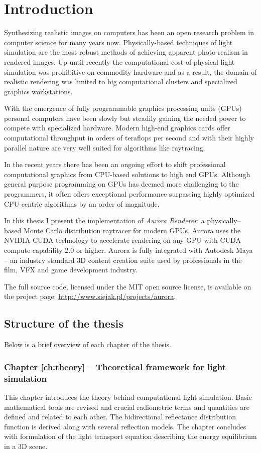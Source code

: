 \chapter{Introduction}
Synthesizing realistic images on computers has been an open research problem in computer science for many years now. Physically-based techniques of light simulation are the most robust methods of achieving apparent photo-realism in rendered images. Up until recently the computational cost of physical light simulation was prohibitive on commodity hardware and as a result, the domain of realistic rendering was limited to big computational clusters and specialized graphics workstations.

With the emergence of fully programmable graphics processing units (GPUs) personal computers have been slowly but steadily gaining the needed power to compete with specialized hardware. Modern high-end graphics cards offer computational throughput in orders of teraflops per second and with their highly parallel nature are very well suited for algorithms like raytracing.

In the recent years there has been an ongoing effort to shift professional computational graphics from CPU-based solutions to high end GPUs. Although general purpose programming on GPUs has deemed more challenging to the programmers, it often offers exceptional performance surpassing highly optimized CPU-centric algorithms by an order of magnitude.

In this thesis I present the implementation of \emph{Aurora Renderer}: a physically--based Monte Carlo distribution raytracer for modern GPUs. Aurora uses the NVIDIA CUDA technology to accelerate rendering on any GPU with CUDA compute capability 2.0 or higher. Aurora is fully integrated with Autodesk Maya -- an industry standard 3D content creation suite used by professionals in the film, VFX and game development industry.

The full source code, licensed under the MIT open source license, is available on the project page: \url{http://www.siejak.pl/projects/aurora}.
\vfill

\section{Structure of the thesis}
Below is a brief overview of each chapter of the thesis.

\subsection{Chapter \ref{ch:theory} -- Theoretical framework for light simulation}
This chapter introduces the theory behind computational light simulation. Basic mathematical tools are revised and crucial radiometric terms and quantities are defined and related to each other. The bidirectional reflectance distribution function is derived along with several reflection models. The chapter concludes with formulation of the light transport equation describing the energy equilibrium in a 3D scene.

